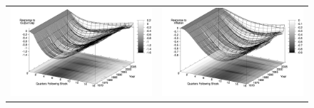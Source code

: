 \documentclass[12pt]{article}
\begin{document}
{\begin{figure}
\begin{tabular}{cc}
\includegraphics[scale=0.12]{images/Irf16_Output_Gap_Monetary_Policy_Shock.png} & \includegraphics[scale=0.12]{images/Irf16_Inflation_Monetary_Policy_Shock.png} 
\end{tabular}
\end{figure}

}
\end{document}
